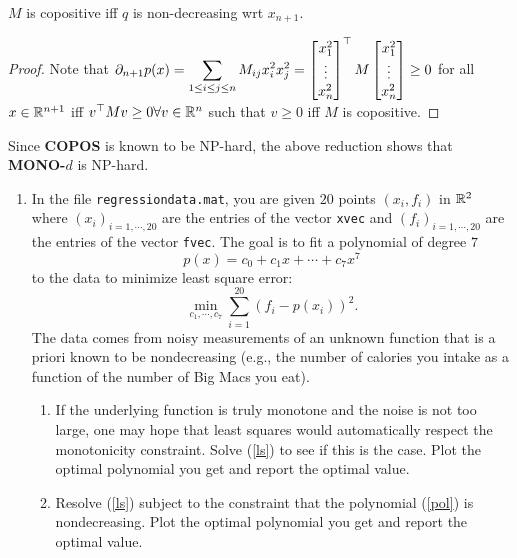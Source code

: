 \begin{enumerate}[label=(\roman*)]
\begin{cl}
$M$ is copositive iff $q$ is non-decreasing wrt $x_{n+1}$.
\end{cl}
\begin{proof}
Note that $\displaystyle\partial_{n+1}p(x) = \sum_{1\le i\le j\le n}M_{ij}x_{i}^{2}x_{j}^{2} = \begin{bmatrix}x_{1}^{2}\\\vdots\\x_{n}^{2}\end{bmatrix}^{\top}M\begin{bmatrix}x_{1}^{2}\\\vdots\\x_{n}^{2}\end{bmatrix}\ge 0$ for all $x\in\mathbb{R}^{n+1}$ iff $v^{\top}Mv\ge 0\forall v\in\mathbb{R}^{n} $ such that $v\ge 0$ iff $M$ is copositive.
\end{proof}
Since \textbf{COPOS} is known to be NP-hard, the above reduction shows that \textbf{MONO-$d$} is NP-hard.
\end{enumerate}

\newpage
\pb
\begin{enumerate}[leftmargin=*]
\item In the file \texttt{regression\textunderscore data.mat}, you are given $20$ points $(x_{i}, f_{i})$ in $\mathbb{R}^{2}$ where $(x_{i})_{i=1,\cdots,20}$ are the entries of the vector \texttt{xvec} and $(f_{i})_{i=1,\cdots,20}$ are the entries of the vector \texttt{fvec}. The goal is to fit a polynomial of degree $7$ \begin{equation}\label{pol} p(x) = c_{0} +c_{1}x+\cdots+c_{7}x^{7}\end{equation} to the data to minimize least square error: \begin{equation}\label{ls}\min_{c_{1},\cdots,c_{7}} \sum_{i=1}^{20}(f_{i}-p(x_{i}))^{2}.\end{equation} The data comes from noisy measurements of an unknown function that is a priori known to be nondecreasing (e.g., the number of calories you intake as a function of the number of Big Macs you eat).
\begin{enumerate}[label=(\alph*)]
\item If the underlying function is truly monotone and the noise is not too large, one may hope that least squares would automatically respect the monotonicity constraint. Solve (\ref{ls}) to see if this is the case. Plot the optimal polynomial you get and report the optimal value.
\item Resolve (\ref{ls}) subject to the constraint that the polynomial (\ref{pol}) is nondecreasing. Plot the optimal polynomial you get and report the optimal value.
\end{enumerate}
\end{enumerate}







